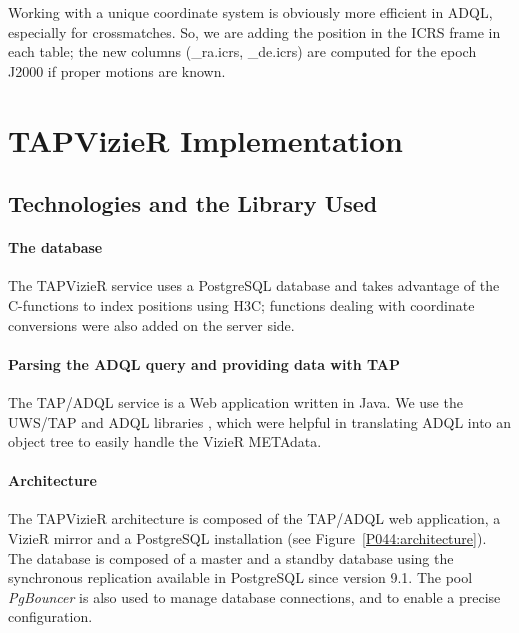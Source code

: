 Working with a unique coordinate system is obviously more efficient in ADQL, especially for crossmatches. So, we are adding the position in the ICRS frame in each table; the new columns (\_ra.icrs, \_de.icrs) are computed for the epoch J2000 if proper motions are known.


\section{TAPVizieR Implementation}

\subsection{Technologies and the Library Used}
\paragraph{The database}


The TAPVizieR service uses a PostgreSQL database and takes advantage of the C-functions to index positions using H3C;  functions dealing with coordinate conversions were also added on the server side.

\paragraph{Parsing the ADQL query and providing data with TAP}

The TAP/ADQL service is a Web application written in Java. We use the UWS/TAP and ADQL libraries \citep{simbad_tap_2011}, which were helpful in translating ADQL into an object tree to easily handle the VizieR METAdata. 

\paragraph{Architecture}
The TAPVizieR architecture is composed of the TAP/ADQL web application, a VizieR mirror and a PostgreSQL installation (see Figure~\ref{P044:architecture}). The database is composed of a master and a standby database using the synchronous replication available in PostgreSQL since version 9.1. The pool {\em PgBouncer} is also used to manage database connections, and to enable a precise configuration. 

